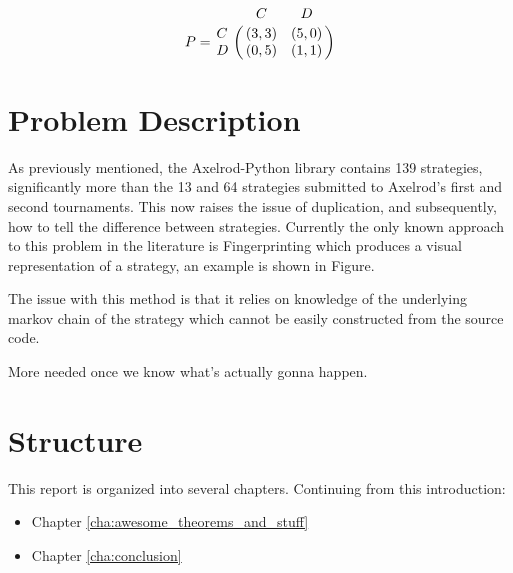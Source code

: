 \begin{equation}\label{eq:payoff_matrix}
% 
P = \bordermatrix{~ & C & D \cr
                  C & (3, 3) & (5, 0) \cr
                  D & (0, 5) & (1, 1) \cr}
% 
\end{equation}

\section{Problem Description}

As previously mentioned, the Axelrod-Python library contains 139 strategies, significantly more than the 13 and 64 strategies submitted to Axelrod's first and second tournaments.
This now raises the issue of duplication, and subsequently, how to tell the difference between strategies.
Currently the only known approach to this problem in the literature is Fingerprinting which produces a visual representation of a strategy, an example is shown in Figure.

The issue with this method is that it relies on knowledge of the underlying markov chain of the strategy which cannot be easily constructed from the source code.

More needed once we know what's actually gonna happen.


\section{Structure}
This report is organized into several chapters. Continuing from this introduction:

\begin{itemize}
    \item Chapter \ref{cha:awesome_theorems_and_stuff}
    
    \item Chapter \ref{cha:conclusion}
\end{itemize}










